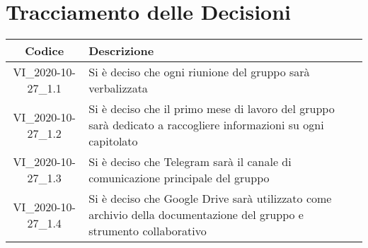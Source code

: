 \section*{Tracciamento delle Decisioni}

\begin{center}
	\begin{longtable}{|c|p{13cm}|}
	\hline
	\rowcolor{lighter-grayer}
	\textbf{Codice} & \textbf{Descrizione} \\
	\hline
	\endfirsthead
	
	\hline
	VI\_2020-10-27\_1.1 & Si è deciso che ogni riunione del gruppo sarà verbalizzata  \\
	\hline
	VI\_2020-10-27\_1.2 & Si è deciso che il primo mese di lavoro del gruppo sarà dedicato a raccogliere informazioni su ogni capitolato  \\
	\hline
	VI\_2020-10-27\_1.3 & Si è deciso che Telegram sarà il canale di comunicazione principale del gruppo \\
	\hline
	VI\_2020-10-27\_1.4 & Si è deciso che Google Drive sarà utilizzato come archivio della documentazione del gruppo e strumento collaborativo \\
	\hline
	\end{longtable}
\end{center}